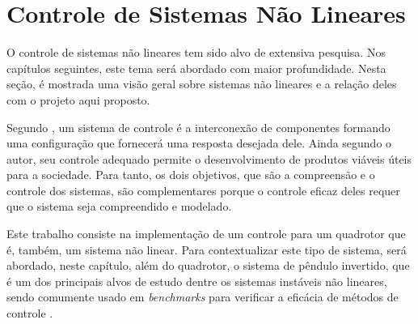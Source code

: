 %
%

\chapter{Controle de Sistemas Não Lineares}
\label{chap:sistemas-nao-lineares}

O controle de sistemas não lineares tem sido alvo de extensiva pesquisa. Nos capítulos seguintes, este tema será abordado com maior profundidade. Nesta seção, é mostrada  uma visão geral sobre sistemas não lineares e a relação deles com o projeto aqui proposto.

Segundo , um sistema de controle é a interconexão de componentes formando uma configuração que fornecerá uma resposta desejada dele. Ainda segundo o autor, seu controle adequado permite o desenvolvimento de produtos viáveis úteis para a sociedade. Para tanto, os dois objetivos, que são a compreensão e o controle dos sistemas, são complementares porque o controle eficaz deles requer que o sistema seja compreendido e modelado.

Este trabalho consiste na implementação de um controle para um quadrotor que é, também, um sistema não linear. Para contextualizar este tipo de sistema, será abordado, neste capítulo, além do quadrotor, o sistema de pêndulo invertido, que é um dos principais alvos de estudo dentre os sistemas instáveis não lineares, sendo comumente usado em \textit{benchmarks} para verificar a eficácia de métodos de controle \cite{Arai2014}.


%



